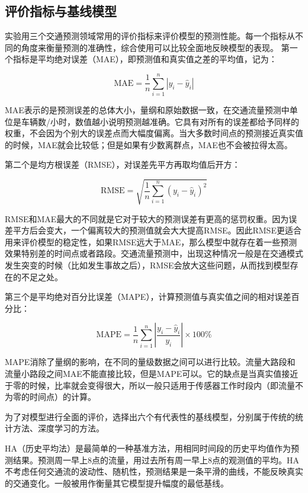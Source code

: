 \subsection{评价指标与基线模型}

实验用三个交通预测领域常用的评价指标来评价模型的预测性能。每一个指标从不同的角度来衡量预测的准确性，综合使用可以比较全面地反映模型的表现。
第一个指标是平均绝对误差（MAE），即预测值和真实值之差的平均值，记为：

\begin{equation}
\text{MAE} = \frac{1}{n} \sum_{i=1}^{n} |y_i - \hat{y}_i|
\end{equation}

MAE表示的是预测误差的总体大小，量纲和原始数据一致，在交通流量预测中单位是车辆数/小时，数值越小说明预测越准确。它具有对所有的误差都给予同样的权重，不会因为个别大的误差点而大幅度偏离。当大多数时间点的预测接近真实值的时候，MAE就会比较低；但是如果有少数离群点，MAE也不会被拉得太高。

第二个是均方根误差（RMSE），对误差先平方再取均值后开方：

\begin{equation}
\text{RMSE} = \sqrt{\frac{1}{n} \sum_{i=1}^{n} (y_i - \hat{y}_i)^2}
\end{equation}

RMSE和MAE最大的不同就是它对于较大的预测误差有更高的惩罚权重。因为误差平方后会变大，一个偏离较大的预测值就会大大提高RMSE。因此RMSE更适合用来评价模型的稳定性，如果RMSE远大于MAE，那么模型中就存在着一些预测效果特别差的时间点或者路段。交通流量预测中，出现这种情况一般是在交通模式发生突变的时候（比如发生事故之后），RMSE会放大这些问题，从而找到模型存在的不足之处。


第三个是平均绝对百分比误差（MAPE），计算预测值与真实值之间的相对误差百分比：

\begin{equation}
\text{MAPE} = \frac{1}{n} \sum_{i=1}^{n} \left|\frac{y_i - \hat{y}_i}{y_i}\right| \times 100\%
\end{equation}

MAPE消除了量纲的影响，在不同的量级数据之间可以进行比较。流量大路段和流量小路段之间MAE不能直接比较，但是MAPE可以。它的缺点是当真实值接近于零的时候，比率就会变得很大，所以一般只适用于传感器工作时段内（即流量不为零的时间点）的计算。

为了对模型进行全面的评价，选择出六个有代表性的基线模型，分别属于传统的统计方法、深度学习的方法。

HA（历史平均法）是最简单的一种基准方法，用相同时间段的历史平均值作为预测结果。预测周一早上8点的流量，用过去所有周一早上8点的观测值的平均。HA 不考虑任何交通流的波动性、随机性，预测结果是一条平滑的曲线，不能反映真实的交通变化。一般被用作衡量其它模型提升幅度的最低基线。

